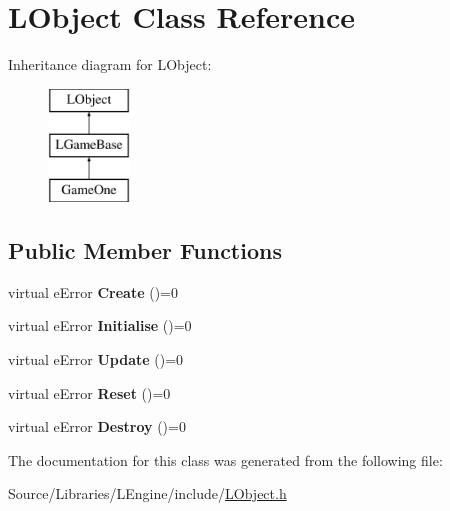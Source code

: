 \hypertarget{class_l_object}{\section{L\-Object Class Reference}
\label{class_l_object}
}
Inheritance diagram for L\-Object\-:\begin{figure}[H]
\begin{center}
\leavevmode
\includegraphics[height=3.000000cm]{class_l_object}
\end{center}
\end{figure}
\subsection*{Public Member Functions}
\begin{DoxyCompactItemize}
\item 
\hypertarget{class_l_object_a121190dfa412ad2d04900601cf5be9d8}{virtual e\-Error {\bfseries Create} ()=0}\label{class_l_object_a121190dfa412ad2d04900601cf5be9d8}

\item 
\hypertarget{class_l_object_aa7775558c54712e90d9f851d1069799d}{virtual e\-Error {\bfseries Initialise} ()=0}\label{class_l_object_aa7775558c54712e90d9f851d1069799d}

\item 
\hypertarget{class_l_object_a08a1f5faba2754f42e431d7b2a28fe95}{virtual e\-Error {\bfseries Update} ()=0}\label{class_l_object_a08a1f5faba2754f42e431d7b2a28fe95}

\item 
\hypertarget{class_l_object_ab8b747a026d8683c242d1a5c52ba6def}{virtual e\-Error {\bfseries Reset} ()=0}\label{class_l_object_ab8b747a026d8683c242d1a5c52ba6def}

\item 
\hypertarget{class_l_object_ac57da01b8d4eddd57d2fed543118e931}{virtual e\-Error {\bfseries Destroy} ()=0}\label{class_l_object_ac57da01b8d4eddd57d2fed543118e931}

\end{DoxyCompactItemize}


The documentation for this class was generated from the following file\-:\begin{DoxyCompactItemize}
\item 
Source/\-Libraries/\-L\-Engine/include/\hyperlink{_l_object_8h}{L\-Object.\-h}\end{DoxyCompactItemize}
